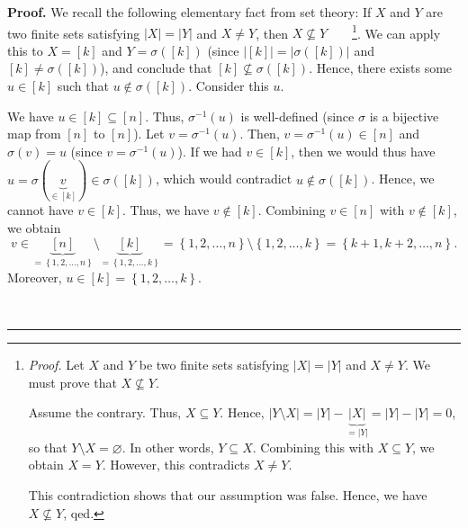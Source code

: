\documentclass
[numbers=enddot,12pt,final,onecolumn,notitlepage,english]{scrartcl}%
\theoremstyle{definition}
\newenvironment{proof}[1][Proof]{\noindent\textbf{#1.} }{\ \rule{0.5em}{0.5em}}
\newenvironment{verlong}{}{}
\begin{document}
\begin{verlong}
\begin{proof}
We recall the following elementary fact from set theory: If $X$ and $Y$ are
two finite sets satisfying $\left\vert X\right\vert =\left\vert Y\right\vert $
and $X\neq Y$, then $X\not \subseteq Y$\ \ \ \ \footnote{\textit{Proof.} Let
$X$ and $Y$ be two finite sets satisfying $\left\vert X\right\vert =\left\vert
Y\right\vert $ and $X\neq Y$. We must prove that $X\not \subseteq Y$.
\par
Assume the contrary. Thus, $X\subseteq Y$. Hence, $\left\vert Y\setminus
X\right\vert =\left\vert Y\right\vert -\underbrace{\left\vert X\right\vert
}_{=\left\vert Y\right\vert }=\left\vert Y\right\vert -\left\vert Y\right\vert
=0$, so that $Y\setminus X=\varnothing$. In other words, $Y\subseteq X$.
Combining this with $X\subseteq Y$, we obtain $X=Y$. However, this contradicts
$X\neq Y$.
\par
This contradiction shows that our assumption was false. Hence, we have
$X\not \subseteq Y$, qed.}. We can apply this to $X=\left[  k\right]  $ and
$Y=\sigma\left(  \left[  k\right]  \right)  $ (since $\left\vert \left[
k\right]  \right\vert =\left\vert \sigma\left(  \left[  k\right]  \right)
\right\vert $ and $\left[  k\right]  \neq\sigma\left(  \left[  k\right]
\right)  $), and conclude that $\left[  k\right]  \not \subseteq \sigma\left(
\left[  k\right]  \right)  $. Hence, there exists some $u\in\left[  k\right]
$ such that $u\notin\sigma\left(  \left[  k\right]  \right)  $. Consider this
$u$.

We have $u\in\left[  k\right]  \subseteq\left[  n\right]  $. Thus,
$\sigma^{-1}\left(  u\right)  $ is well-defined (since $\sigma$ is a bijective
map from $\left[  n\right]  $ to $\left[  n\right]  $). Let $v=\sigma
^{-1}\left(  u\right)  $. Then, $v=\sigma^{-1}\left(  u\right)  \in\left[
n\right]  $ and $\sigma\left(  v\right)  =u$ (since $v=\sigma^{-1}\left(
u\right)  $). If we had $v\in\left[  k\right]  $, then we would thus have
$u=\sigma\left(  \underbrace{v}_{\in\left[  k\right]  }\right)  \in
\sigma\left(  \left[  k\right]  \right)  $, which would contradict
$u\notin\sigma\left(  \left[  k\right]  \right)  $. Hence, we cannot have
$v\in\left[  k\right]  $. Thus, we have $v\notin\left[  k\right]  $. Combining
$v\in\left[  n\right]  $ with $v\notin\left[  k\right]  $, we obtain%
\[
v\in\underbrace{\left[  n\right]  }_{=\left\{  1,2,\ldots,n\right\}
}\setminus\underbrace{\left[  k\right]  }_{=\left\{  1,2,\ldots,k\right\}
}=\left\{  1,2,\ldots,n\right\}  \setminus\left\{  1,2,\ldots,k\right\}
=\left\{  k+1,k+2,\ldots,n\right\}  .
\]
Moreover, $u\in\left[  k\right]  =\left\{  1,2,\ldots,k\right\}  $.


\end{proof}
\end{verlong}
\end{document}
